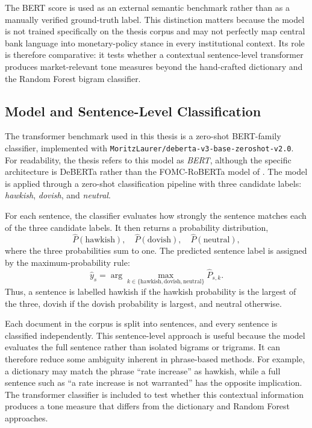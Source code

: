 The BERT score is used as an external semantic benchmark rather than as a
manually verified ground-truth label. This distinction matters because
the model is not trained specifically on the thesis corpus and may not
perfectly map central bank language into monetary-policy stance in every
institutional context. Its role is therefore comparative: it tests
whether a contextual sentence-level transformer produces market-relevant
tone measures beyond the hand-crafted dictionary and the Random Forest
bigram classifier.

\subsection{Model and Sentence-Level Classification}

The transformer benchmark used in this thesis is a zero-shot
BERT-family classifier, implemented with
\texttt{MoritzLaurer/deberta-v3-base-zeroshot-v2.0}. For readability,
the thesis refers to this model as \emph{BERT}, although the specific
architecture is DeBERTa rather than the FOMC-RoBERTa model of
\citet{shah2023}. The model is applied through a zero-shot
classification pipeline with three candidate labels: \emph{hawkish},
\emph{dovish}, and \emph{neutral}.

For each sentence, the classifier evaluates how strongly the sentence
matches each of the three candidate labels. It then returns a probability
distribution,
\[
\hat{P}(\text{hawkish}), \quad
\hat{P}(\text{dovish}), \quad
\hat{P}(\text{neutral}),
\]
where the three probabilities sum to one. The predicted sentence label is
assigned by the maximum-probability rule:
\[
\widehat{y}_s
=
\arg\max_{k \in \{\text{hawkish},\text{dovish},\text{neutral}\}}
\hat{P}_{s,k}.
\]
Thus, a sentence is labelled hawkish if the hawkish probability is the
largest of the three, dovish if the dovish probability is largest, and
neutral otherwise.

Each document in the corpus is split into sentences, and every sentence
is classified independently. This sentence-level approach is useful
because the model evaluates the full sentence rather than isolated
bigrams or trigrams. It can therefore reduce some ambiguity inherent in
phrase-based methods. For example, a dictionary may match the phrase
``rate increase'' as hawkish, while a full sentence such as ``a rate
increase is not warranted'' has the opposite implication. The transformer
classifier is included to test whether this contextual information
produces a tone measure that differs from the dictionary and Random
Forest approaches.


